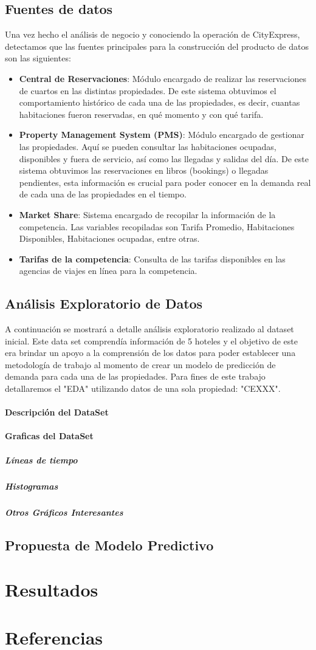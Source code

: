 \documentclass[a4paper,11pt]{article}
\begin{document}
\subsection{Fuentes de datos}
Una vez hecho el análisis de negocio y conociendo la operación de CityExpress, detectamos que las fuentes principales para la construcción del producto de datos son las siguientes:
 \begin{itemize}
\item \textbf{Central de Reservaciones}: Módulo encargado de realizar las reservaciones de cuartos en las distintas propiedades. De este sistema obtuvimos el comportamiento histórico de cada una de las propiedades, es decir, cuantas habitaciones fueron reservadas, en qué momento y con qué tarifa.
\item \textbf{Property Management System (PMS)}: Módulo encargado de gestionar las propiedades. Aquí se pueden consultar las habitaciones ocupadas, disponibles y fuera de servicio, así como las llegadas y salidas del día. De este sistema obtuvimos las reservaciones en libros (bookings) o llegadas pendientes, esta información es crucial para poder conocer en la demanda real de cada una de las propiedades en el tiempo.
\item \textbf{Market Share}: Sistema encargado de recopilar la información de la competencia. Las variables recopiladas son Tarifa Promedio, Habitaciones Disponibles, Habitaciones ocupadas, entre otras. 
\item \textbf{Tarifas de la competencia}: Consulta de las tarifas disponibles en las agencias de viajes en línea para la competencia.
\end{itemize}
\subsection{Análisis Exploratorio de Datos}
A continuación se mostrará a detalle análisis exploratorio realizado al dataset inicial. Este data set comprendía información de 5 hoteles y el objetivo de este era brindar un apoyo a la comprensión de los datos para poder establecer una metodología de trabajo al momento de crear un modelo de predicción de demanda para cada una de las propiedades. Para fines de este trabajo detallaremos el "EDA" utilizando datos de una sola propiedad: "CEXXX".
\paragraph{Descripción del DataSet}
\paragraph{Graficas del DataSet}
\subparagraph{Líneas de tiempo}
\subparagraph{Histogramas}
\subparagraph{Otros Gráficos Interesantes}
\subsection{Propuesta de Modelo Predictivo}
\section{Resultados}
\section{Referencias}
\end{document}
